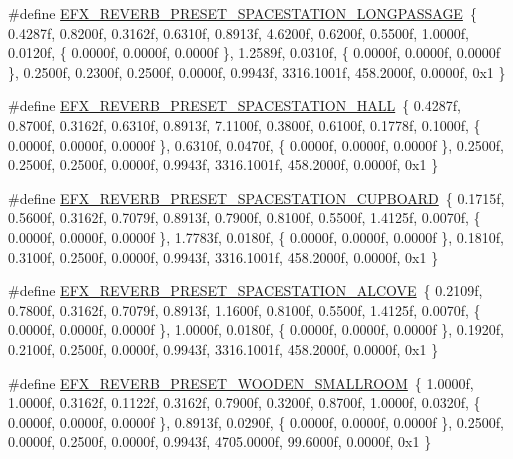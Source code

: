 \begin{DoxyCompactItemize}
\item 
\#define \hyperlink{efx-presets_8h_a8959825c810876082f20684cc9e7203a}{E\+F\+X\+\_\+\+R\+E\+V\+E\+R\+B\+\_\+\+P\+R\+E\+S\+E\+T\+\_\+\+S\+P\+A\+C\+E\+S\+T\+A\+T\+I\+O\+N\+\_\+\+L\+O\+N\+G\+P\+A\+S\+S\+A\+GE}~\{ 0.\+4287f, 0.\+8200f, 0.\+3162f, 0.\+6310f, 0.\+8913f, 4.\+6200f, 0.\+6200f, 0.\+5500f, 1.\+0000f, 0.\+0120f, \{ 0.\+0000f, 0.\+0000f, 0.\+0000f \}, 1.\+2589f, 0.\+0310f, \{ 0.\+0000f, 0.\+0000f, 0.\+0000f \}, 0.\+2500f, 0.\+2300f, 0.\+2500f, 0.\+0000f, 0.\+9943f, 3316.\+1001f, 458.\+2000f, 0.\+0000f, 0x1 \}
\item 
\#define \hyperlink{efx-presets_8h_a06d326b0ff198538c867c2e2a05bee01}{E\+F\+X\+\_\+\+R\+E\+V\+E\+R\+B\+\_\+\+P\+R\+E\+S\+E\+T\+\_\+\+S\+P\+A\+C\+E\+S\+T\+A\+T\+I\+O\+N\+\_\+\+H\+A\+LL}~\{ 0.\+4287f, 0.\+8700f, 0.\+3162f, 0.\+6310f, 0.\+8913f, 7.\+1100f, 0.\+3800f, 0.\+6100f, 0.\+1778f, 0.\+1000f, \{ 0.\+0000f, 0.\+0000f, 0.\+0000f \}, 0.\+6310f, 0.\+0470f, \{ 0.\+0000f, 0.\+0000f, 0.\+0000f \}, 0.\+2500f, 0.\+2500f, 0.\+2500f, 0.\+0000f, 0.\+9943f, 3316.\+1001f, 458.\+2000f, 0.\+0000f, 0x1 \}
\item 
\#define \hyperlink{efx-presets_8h_ae01167f43aaf48bd4fc8ab19c1f1c5d9}{E\+F\+X\+\_\+\+R\+E\+V\+E\+R\+B\+\_\+\+P\+R\+E\+S\+E\+T\+\_\+\+S\+P\+A\+C\+E\+S\+T\+A\+T\+I\+O\+N\+\_\+\+C\+U\+P\+B\+O\+A\+RD}~\{ 0.\+1715f, 0.\+5600f, 0.\+3162f, 0.\+7079f, 0.\+8913f, 0.\+7900f, 0.\+8100f, 0.\+5500f, 1.\+4125f, 0.\+0070f, \{ 0.\+0000f, 0.\+0000f, 0.\+0000f \}, 1.\+7783f, 0.\+0180f, \{ 0.\+0000f, 0.\+0000f, 0.\+0000f \}, 0.\+1810f, 0.\+3100f, 0.\+2500f, 0.\+0000f, 0.\+9943f, 3316.\+1001f, 458.\+2000f, 0.\+0000f, 0x1 \}
\item 
\#define \hyperlink{efx-presets_8h_aa9d3471810ca5d80f56f18841dd3abc8}{E\+F\+X\+\_\+\+R\+E\+V\+E\+R\+B\+\_\+\+P\+R\+E\+S\+E\+T\+\_\+\+S\+P\+A\+C\+E\+S\+T\+A\+T\+I\+O\+N\+\_\+\+A\+L\+C\+O\+VE}~\{ 0.\+2109f, 0.\+7800f, 0.\+3162f, 0.\+7079f, 0.\+8913f, 1.\+1600f, 0.\+8100f, 0.\+5500f, 1.\+4125f, 0.\+0070f, \{ 0.\+0000f, 0.\+0000f, 0.\+0000f \}, 1.\+0000f, 0.\+0180f, \{ 0.\+0000f, 0.\+0000f, 0.\+0000f \}, 0.\+1920f, 0.\+2100f, 0.\+2500f, 0.\+0000f, 0.\+9943f, 3316.\+1001f, 458.\+2000f, 0.\+0000f, 0x1 \}
\item 
\#define \hyperlink{efx-presets_8h_ab8ae77e2171d3d32a6f70b46ed47c6ff}{E\+F\+X\+\_\+\+R\+E\+V\+E\+R\+B\+\_\+\+P\+R\+E\+S\+E\+T\+\_\+\+W\+O\+O\+D\+E\+N\+\_\+\+S\+M\+A\+L\+L\+R\+O\+OM}~\{ 1.\+0000f, 1.\+0000f, 0.\+3162f, 0.\+1122f, 0.\+3162f, 0.\+7900f, 0.\+3200f, 0.\+8700f, 1.\+0000f, 0.\+0320f, \{ 0.\+0000f, 0.\+0000f, 0.\+0000f \}, 0.\+8913f, 0.\+0290f, \{ 0.\+0000f, 0.\+0000f, 0.\+0000f \}, 0.\+2500f, 0.\+0000f, 0.\+2500f, 0.\+0000f, 0.\+9943f, 4705.\+0000f, 99.\+6000f, 0.\+0000f, 0x1 \}

\end{DoxyCompactItemize}
